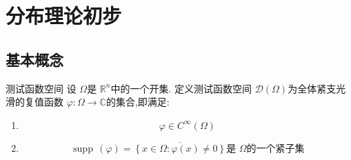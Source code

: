 \documentclass[../../main.tex]{subfiles}
\begin{document}
\chapter{ 分布理论初步 }
\section{基本概念}
\begin{definition}{测试函数空间}
     设 \(   \Omega   \)是 \(  \mathbb{R} ^{n}  \)中的一个开集. 定义测试函数空间 \(  \mathcal{D}\left(  \Omega  \right)   \)为全体紧支光滑的复值函数 \(   \varphi : \Omega \to \mathbb{C}   \)的集合,即满足:
    \begin{enumerate}
        \item \[
         \varphi \in C^{\infty}\left(  \Omega  \right) 
        \]
        \item \[
        \operatorname{supp}\,\left(  \varphi  \right)= \overline{\left\{ x \in  \Omega  : \varphi \left( x \right)\neq 0 \right\}}\text{是 } \Omega \text{的一个紧子集} 
        \]  
    \end{enumerate}
\end{definition}
\end{document}

